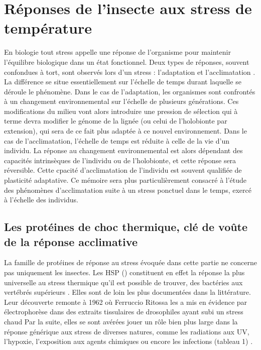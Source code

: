 \section{Réponses de l'insecte aux stress de température}

En biologie tout stress appelle une réponse de l'organisme pour maintenir l'équilibre biologique dans un état fonctionnel.
Deux types de réponses, souvent confondues à tort, sont observés lors d'un stress : l'adaptation et l'acclimatation \cite{somero2010}.
La différence se situe essentiellement sur l'échelle de temps durant laquelle se déroule le phénomène.
Dans le cas de l'adaptation, les organismes sont confrontés à un changement environnemental sur l'échelle de plusieurs générations.
Ces modifications du milieu vont alors introduire une pression de sélection qui à terme devra modifier le génome de la lignée (ou celui de l'holobionte par extension), qui sera de ce fait plus adaptée à ce nouvel environnement.
Dans le cas de l'acclimatation, l'échelle de temps est réduite à celle de la vie d'un individu. La réponse au changement environnemental est alors dépendant des capacités intrinsèques de l'individu ou de l'holobionte, et cette réponse sera réversible.
Cette cpacité d'acclimatation de l'individu est souvent qualifiée de plasticité adaptative.
Ce mémoire sera plus particulièrement consacré à l'étude des
phénomènes d'acclimatation suite à un stress ponctuel dans le temps, exercé à l'échelle des individus.

	\subsection{Les protéines de choc thermique, clé de voûte de la réponse acclimative}

	La famille de protéines de réponse au stress évoquée dans cette partie ne concerne pas uniquement les insectes.
	Les HSP () constituent en effet la réponse la plus universelle au stress thermique qu'il est possible de trouver, des bactéries aux vertébrés supérieurs \cite{lindquist1986}.
	Elles sont de loin les plus documentées dans la littérature.
	Leur découverte remonte à 1962 où Ferruccio Ritossa les a mis en évidence par électrophorèse dans des extraits tissulaires de drosophiles ayant subi un stress chaud \cite{ritossa1996, ritossa1962} %
	Par la suite, elles se sont avérées jouer un rôle bien plus large dans la réponse générique aux stress de diverses natures, comme les radiations aux UV, l'hypoxie, l'exposition aux agents chimiques ou encore les infections (tableau 1) \cite{sorensen2003}.

